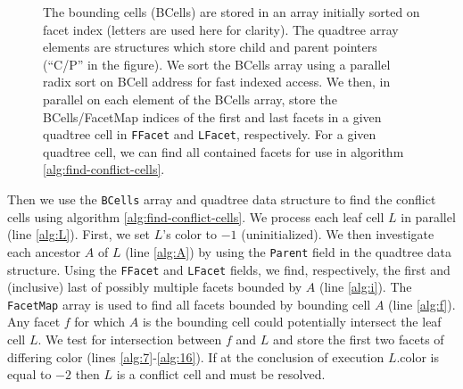 \documentclass[final,3p,times,twocolumn]{elsarticle}
\begin{document}
\begin{figure}
  \centering
  \caption{
    \protect{} The bounding cells (BCells) are stored in an array initially sorted on facet index (letters are used here for clarity). The quadtree array elements are structures which store child and parent pointers (``C/P'' in the figure).
    \protect{} We sort the BCells array using a parallel radix sort on BCell address for fast indexed access. We then, in parallel on each element of the BCells array, store the BCells/FacetMap indices of the first and last facets in a given quadtree cell in \texttt{FFacet} and \texttt{LFacet}, respectively.
\protect{} For a given quadtree cell, we can find all contained facets for use in algorithm \ref{alg:find-conflict-cells}.
  }
  \label{fig:data-structures}
\end{figure}

Then we use the \texttt{BCells} array and quadtree data structure to find the conflict cells using algorithm \ref{alg:find-conflict-cells}. We process each leaf cell $L$ in parallel (line \ref{alg:L}). First, we set $L$'s color to $-1$ (uninitialized). We then investigate each ancestor $A$ of $L$ (line \ref{alg:A}) by using the \texttt{Parent} field in the quadtree data structure. Using the \texttt{FFacet} and \texttt{LFacet} fields, we find, respectively, the first and (inclusive) last of possibly multiple facets bounded by $A$ (line \ref{alg:i}). The \texttt{FacetMap} array is used to find all facets bounded by bounding cell $A$ (line \ref{alg:f}). Any facet $f$ for which $A$ is the bounding cell could potentially intersect the leaf cell $L$. We test for intersection between $f$ and $L$ and store the first two facets of differing color (lines \ref{alg:7}-\ref{alg:16}). If at the conclusion of execution $L$.color is equal to $-2$ then $L$ is a conflict cell and must be resolved.
\end{document}
